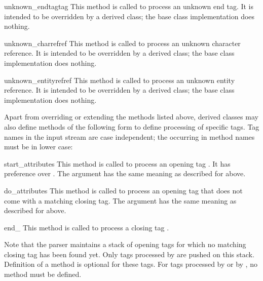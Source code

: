 \begin{funcdesc}{unknown_endtag}{tag}
This method is called to process an unknown end tag.  It is intended
to be overridden by a derived class; the base class implementation
does nothing.
\end{funcdesc}

\begin{funcdesc}{unknown_charref}{ref}
This method is called to process an unknown character reference.  It
is intended to be overridden by a derived class; the base class
implementation does nothing.
\end{funcdesc}

\begin{funcdesc}{unknown_entityref}{ref}
This method is called to process an unknown entity reference.  It is
intended to be overridden by a derived class; the base class
implementation does nothing.
\end{funcdesc}

Apart from overriding or extending the methods listed above, derived
classes may also define methods of the following form to define
processing of specific tags.  Tag names in the input stream are case
independent; the  occurring in method names must be in lower
case:

\begin{funcdesc}{start_}{attributes}
This method is called to process an opening tag .  It has
preference over .  The  argument
has the same meaning as described for  above.
\end{funcdesc}

\begin{funcdesc}{do_}{attributes}
This method is called to process an opening tag  that does
not come with a matching closing tag.  The  argument
has the same meaning as described for  above.
\end{funcdesc}

\begin{funcdesc}{end_}{}
This method is called to process a closing tag .
\end{funcdesc}

Note that the parser maintains a stack of opening tags for which no
matching closing tag has been found yet.  Only tags processed by
 are pushed on this stack.  Definition of a
 method is optional for these tags.  For tags
processed by  or by , no
 method must be defined.
